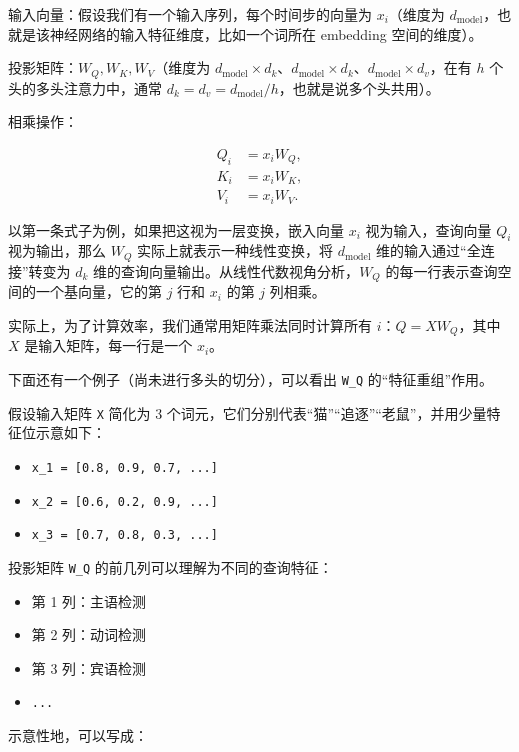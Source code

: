 输入向量：假设我们有一个输入序列，每个时间步的向量为 \(x_i\)（维度为 \(d_{\mathrm{model}}\)，也就是该神经网络的输入特征维度，比如一个词所在 embedding 空间的维度）。

投影矩阵：\(W_Q,W_K,W_V\)（维度为 \(d_{\mathrm{model}}\times d_k\)、\(d_{\mathrm{model}}\times d_k\)、\(d_{\mathrm{model}}\times d_v\)，在有 \(h\) 个头的多头注意力中，通常 \(d_k=d_v=d_{\mathrm{model}}/h\)，也就是说多个头共用）。

相乘操作：

\[
\begin{aligned}
Q_i &= x_i W_Q,\\
K_i &= x_i W_K,\\
V_i &= x_i W_V.
\end{aligned}
\]

以第一条式子为例，如果把这视为一层变换，嵌入向量 \(x_i\) 视为输入，查询向量 \(Q_i\) 视为输出，那么 \(W_Q\) 实际上就表示一种线性变换，将 \(d_{\mathrm{model}}\) 维的输入通过``全连接''转变为 \(d_k\) 维的查询向量输出。从线性代数视角分析，\(W_Q\) 的每一行表示查询空间的一个基向量，它的第 \(j\) 行和 \(x_i\) 的第 \(j\) 列相乘。

实际上，为了计算效率，我们通常用矩阵乘法同时计算所有 \(i\)：\(Q=XW_Q\)，其中 \(X\) 是输入矩阵，每一行是一个 \(x_i\)。

下面还有一个例子（尚未进行多头的切分），可以看出 \texttt{W\_Q} 的``特征重组''作用。

假设输入矩阵 \texttt{X} 简化为 3 个词元，它们分别代表``猫''``追逐''``老鼠''，并用少量特征位示意如下：

\begin{itemize}
\tightlist
\item
  \texttt{x\_1\ =\ {[}0.8,\ 0.9,\ 0.7,\ ...{]}}
\item
  \texttt{x\_2\ =\ {[}0.6,\ 0.2,\ 0.9,\ ...{]}}
\item
  \texttt{x\_3\ =\ {[}0.7,\ 0.8,\ 0.3,\ ...{]}}
\end{itemize}

投影矩阵 \texttt{W\_Q} 的前几列可以理解为不同的查询特征：

\begin{itemize}
\tightlist
\item
  第 1 列：主语检测
\item
  第 2 列：动词检测
\item
  第 3 列：宾语检测
\item
  \texttt{...}
\end{itemize}

示意性地，可以写成：

